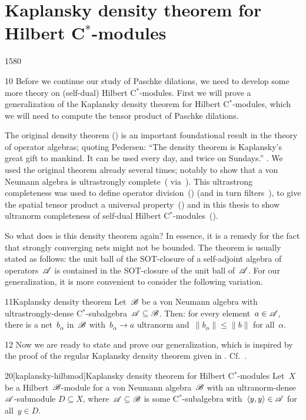 
\section{Kaplansky density theorem for Hilbert C$^*$-modules}
\begin{parsec}{1580}%
\begin{point}{10}%
Before we continue our study of Paschke dilations,
    we need to develop some more theory on (self-dual) Hilbert C$^*$-modules.
First we will prove a generalization of the Kaplansky density
    theorem for Hilbert C$^*$-modules,
    which we will need to compute the tensor product of Paschke dilations.

The original density theorem ()
    is an important foundational result
    in the theory of operator algebras;
    quoting Pedersen:
    ``The density theorem is Kaplansky's great gift to mankind.
    It can be used every day, and twice on
    Sundays.'' \cite[\S2.3.4]{pedersen1979c}.
We used the original theorem already several times;
    notably to show that
        a von Neumann algebra is
        ultrastrongly complete~(
        via~).
This ultrastrong completeness was used
    to define operator division~()
        (and in turn filters~),
        to give the spatial tensor product a universal
        property~()
    and in this thesis to show ultranorm completeness
        of self-dual Hilbert C$^*$-modules~().

So what does is this density theorem again?
In essence, it is a remedy for the fact
    that strongly converging nets might not be bounded.
The theorem is usually stated as follows:
    the unit ball of the SOT-closure of a self-adjoint algebra
    of operators~$\mathscr{A}$
    is contained in the SOT-closure of the unit ball of~$\mathscr{A}$.
For our generalization, it is more convenient to consider the following
    variation.
\end{point}
\begin{point}{11}{Kaplansky density theorem}%
Let~$\mathscr{B}$ be a von Neumann algebra with ultrastrongly-dense
    C$^*$-subalgebra~$\mathscr{A}  \subseteq \mathscr{B}$.
Then: for every element~$a \in \mathscr{A}$,
    there is a net~$b_\alpha$ in~$\mathscr{B}$
    with~$b_\alpha \to a$ ultranorm
    and~$\|b_\alpha\| \leq \|b\|$ for all~$\alpha$.
\end{point}
\begin{point}{12}%
Now we are ready to state and prove our generalization,
    which is inspired by the proof of the regular Kaplansky density theorem
    given in \cite[thm.~1.2.2]{arveson2012invitation}.
Cf.~.
\end{point}
\begin{point}{20}[kaplansky-hilbmod]{Kaplansky density theorem for Hilbert C$^*$-modules}%
Let~$X$ be a Hilbert~$\mathscr{B}$-module for a von Neumann algebra~$\mathscr{B}$
    with an ultranorm-dense $\mathscr{A}$-submodule $D \subseteq X$,
    where~$\mathscr{A} \subseteq \mathscr{B}$ is some C$^*$-subalgebra
    with~$\langle y,y \rangle \in \mathscr{A}$ for all~$y \in D$.


\end{point}
\end{parsec}
